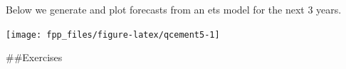 \documentclass[]{book}
\newenvironment{Shaded}{\begin{snugshade}}{\end{snugshade}}
\newcommand{\CommentTok}[1]{\textcolor[rgb]{0.56,0.35,0.01}{\textit{#1}}}
\newcommand{\DataTypeTok}[1]{\textcolor[rgb]{0.13,0.29,0.53}{#1}}
\newcommand{\DecValTok}[1]{\textcolor[rgb]{0.00,0.00,0.81}{#1}}
\newcommand{\KeywordTok}[1]{\textcolor[rgb]{0.13,0.29,0.53}{\textbf{#1}}}
\newcommand{\NormalTok}[1]{#1}
\newcommand{\OperatorTok}[1]{\textcolor[rgb]{0.81,0.36,0.00}{\textbf{#1}}}
\newcommand{\StringTok}[1]{\textcolor[rgb]{0.31,0.60,0.02}{#1}}
\begin{document}
Below we generate and plot forecasts from an ets model for the next 3 years.

\begin{Shaded}
\end{Shaded}

\begin{center}\texttt{[image: fpp\_files/figure-latex/qcement5-1]} \end{center}

\#\#Exercises
\end{document}
